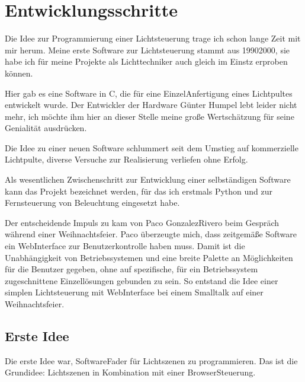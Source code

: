 \documentclass[letterpaper,10pt,ngerman]{sphinxmanual}
\begin{document}
\begin{sphinxVerbatim}[commandchars=\\\{\}]
  
 
\end{sphinxVerbatim}


\chapter{Entwicklungsschritte}
\label{\detokenize{history:entwicklungsschritte}}\label{\detokenize{history:history-label}}\label{\detokenize{history::doc}}
Die Idee zur Programmierung einer Lichtsteuerung trage ich schon lange Zeit
mit mir herum. Meine erste Software zur Lichtsteuerung stammt aus 1990\sphinxhyphen{}2000,
sie habe ich für meine Projekte als Lichttechniker auch gleich im Einstz
erproben können.

Hier gab es eine Software in C, die für eine Einzel\sphinxhyphen{}Anfertigung eines
Lichtpultes entwickelt wurde. Der Entwickler der Hardware Günter Humpel
lebt leider nicht mehr, ich möchte ihm hier an dieser Stelle meine
große Wertschätzung für seine Genialität ausdrücken.

Die Idee zu einer neuen Software schlummert seit dem Umstieg auf
kommerzielle Lichtpulte, diverse Versuche zur Realisierung verliefen
ohne Erfolg.

Als wesentlichen Zwischenschritt zur Entwicklung einer selbständigen
Software kann das Projekt  bezeichnet werden, für das ich
erstmals Python und
zur Fernsteuerung von Beleuchtung eingesetzt habe.

Der entscheidende Impuls zu  kam von Paco Gonzalez\sphinxhyphen{}Rivero beim
Gespräch während einer Weihnachtsfeier. Paco überzeugte mich, dass
zeitgemäße Software ein Web\sphinxhyphen{}Interface zur Benutzerkontrolle haben muss.
Damit ist die Unabhängigkeit von Betriebssystemen und eine
breite Palette an Möglichkeiten für die Benutzer gegeben, ohne auf
spezifische, für ein Betriebssystem zugeschnittene Einzellösungen
gebunden zu sein.
So entstand die Idee einer simplen Lichtsteuerung mit Web\sphinxhyphen{}Interface
bei einem Smalltalk auf einer Weihnachtsfeier.


\section{Erste Idee}
\label{\detokenize{history:erste-idee}}
Die erste Idee war, Software\sphinxhyphen{}Fader für Lichtszenen zu programmieren.
Das ist die Grundidee: Lichtszenen in Kombination mit einer
Browser\sphinxhyphen{}Steuerung.
\end{document}
